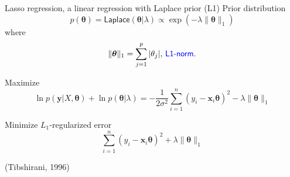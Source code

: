 \documentclass[
  ignorenonframetext,
  aspectratio=169]{beamer}
\begin{document}
\begin{frame}{Lasso regression, a linear regression with Laplace prior
(L1)}
\protect\hypertarget{lasso-regression-a-linear-regression-with-laplace-prior-l1}{}
Prior distribution \[
p(\boldsymbol{\theta}) = \textsf{Laplace}(\boldsymbol{\theta}| \lambda) \propto \exp\left(-\lambda\|\boldsymbol{\theta}\|_{1}\right)
\] where \large
\[\|\boldsymbol{\theta}\|_{1} = \sum_{j=1}^{p} |\theta_{j}|,\,\textsf{\color{blue}L1-norm}.\]

\normalsize

Maximize \[
\ln p(\mathbf{y}|X,\boldsymbol{\theta}) + \ln p(\boldsymbol{\theta}|\lambda)
= - \frac{1}{2\sigma^{2}} \sum_{i=1}^{n} (y_{i} - \mathbf{x}_{i} \boldsymbol{\theta})^{2}
- \lambda \|\boldsymbol{\theta}\|_{1}
\]

Minimize \(L_{1}\)-regularized error \[
\sum_{i=1}^{n} (y_{i} - \mathbf{x}_{i} \boldsymbol{\theta})^{2}
+ \lambda \|\boldsymbol{\theta}\|_{1}
\]

(Tibshirani, 1996)
\end{frame}
\end{document}

